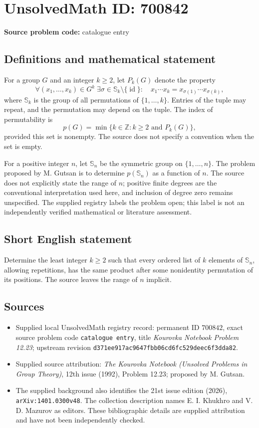 \documentclass[11pt]{article}
\newcommand{\Z}{\mathbb{Z}}
\begin{document}
\section*{UnsolvedMath ID: 700842}
\textbf{Source problem code:} catalogue entry
\subsection{Definitions and mathematical statement}
For a group \(G\) and an integer \(k\geq 2\), let \(P_k(G)\) denote the property
\[
\forall (x_1,\ldots,x_k)\in G^k\;\exists\sigma\in\mathbb{S}_k\setminus\{\operatorname{id}\}:
\quad x_1\cdots x_k=x_{\sigma(1)}\cdots x_{\sigma(k)},
\]
where \(\mathbb{S}_k\) is the group of all permutations of \(\{1,\ldots,k\}\). Entries of the tuple may repeat, and the permutation may depend on the tuple. The index of permutability is
\[
p(G)=\min\{k\in\Z:k\geq 2\text{ and }P_k(G)\},
\]
provided this set is nonempty. The source does not specify a convention when the set is empty.

For a positive integer \(n\), let \(\mathbb{S}_n\) be the symmetric group on \(\{1,\ldots,n\}\). The problem proposed by M. Gutsan is to determine \(p(\mathbb{S}_n)\) as a function of \(n\). The source does not explicitly state the range of \(n\); positive finite degrees are the conventional interpretation used here, and inclusion of degree zero remains unspecified. The supplied registry labels the problem open; this label is not an independently verified mathematical or literature assessment.
\subsection{Short English statement}
Determine the least integer \(k\geq 2\) such that every ordered list of \(k\) elements of \(\mathbb{S}_n\), allowing repetitions, has the same product after some nonidentity permutation of its positions. The source leaves the range of \(n\) implicit.
\subsection{Sources}
\begin{itemize}
\item Supplied local UnsolvedMath registry record: permanent ID \(700842\), exact source problem code \texttt{catalogue entry}, title \emph{Kourovka Notebook Problem 12.23}; upstream revision \texttt{d371ee917ac9647fbb06cd6fc529deec6f3dda82}.
\item Supplied source attribution: \emph{The Kourovka Notebook (Unsolved Problems in Group Theory)}, 12th issue (1992), Problem 12.23; proposed by M. Gutsan.
\item The supplied background also identifies the 21st issue edition (2026), \texttt{arXiv:1401.0300v48}. The collection description names E. I. Khukhro and V. D. Mazurov as editors. These bibliographic details are supplied attribution and have not been independently checked.
\end{itemize}
\end{document}
